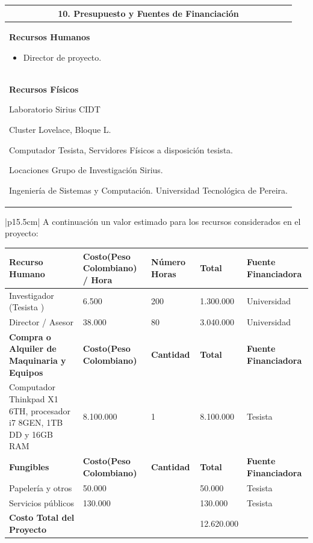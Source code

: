\documentclass[letter,12pt]{article}
\begin{document}
\begin{center}
\begin{tabular}{|p{15.5cm}|}
\hline
\multicolumn{1}{|c|}{ \textbf{10. Presupuesto y Fuentes de Financiación}}\\
\hline

\textbf{Recursos Humanos}
\begin{itemize}
    \item Director de proyecto.
\end{itemize}\\
\textbf{Recursos Físicos}
\item Laboratorio Sirius CIDT
    \item Cluster Lovelace, Bloque L.
    \item Computador Tesista, Servidores Físicos a disposición tesista.
    \item Locaciones Grupo de Investigación Sirius. \par
    Ingeniería de Sistemas y Computación. Universidad Tecnológica de Pereira.
\hline
\end{tabular}
\end{center}
\begin{center}
\begin{tabular}{|p{15.5cm}|}
\hline
	A continuación un valor estimado para los recursos considerados en el proyecto:
	\begin{center}
    \begin{tabular}{|p{2.5cm}|p{3cm}|p{2cm}|p{2cm}|p{3cm}|}
    \hline
    \textbf{Recurso Humano} & \textbf{Costo(Peso Colombiano) / Hora } & \textbf{Número Horas} & \textbf{Total} & \textbf{Fuente Financiadora} \\
    \hline
    Investigador (Tesista   ) & 6.500 & 200 & 1.300.000 & Universidad \\
    \hline    \hline
    Director / Asesor & 38.000 & 80 & 3.040.000 & Universidad \\
    \hline
    \textbf{Compra o Alquiler de Maquinaria y Equipos} & \textbf{Costo(Peso Colombiano) } & \textbf{Cantidad} & \textbf{Total} & \textbf{Fuente Financiadora} \\
    \hline
    Computador Thinkpad X1 6TH, procesador i7 8GEN, 1TB DD y 16GB RAM & 8.100.000 & 1 & 8.100.000 & Tesista  \\
    \hline

    \textbf{Fungibles} & \textbf{Costo(Peso Colombiano) } & \textbf{Cantidad} & \textbf{Total} & \textbf{Fuente Financiadora} \\
    \hline
    Papelería y otros & 50.000 &  & 50.000 & Tesista \\
    \hline
    Servicios públicos & 130.000 &  & 130.000 & Tesista  \\
    \hline
    \textbf{Costo Total del Proyecto} &  &  & 12.620.000 &  \\
    \hline
    \end{tabular}
    \end{center}\\
\hline
\end{tabular}
\end{center}
\end{document}
